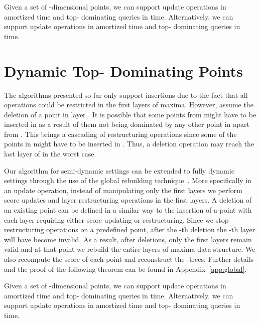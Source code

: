 \documentclass{llncs}
\begin{document}
\begin{theorem} \label{thm:sd}
Given a set  of  -dimensional points, we can support update operations in  amortized time and top- dominating queries in  time. Alternatively, we can support update operations in  amortized time and top- dominating queries in  time.
\end{theorem}



\section{Dynamic Top- Dominating Points} \label{section:DynamicTopKDom}

The algorithms presented so far only support insertions due to the fact that all operations could be restricted in the first  layers of maxima. However, assume the deletion of a point  in layer . It is possible that some points from  might have to be inserted in  as a result of them not being dominated by any other point in  apart from . This brings a cascading of restructuring operations since some of the points in  might have to be inserted in . Thus, a deletion operation may reach the last layer of  in the worst case.

Our algorithm for semi-dynamic settings can be extended to fully dynamic settings through the use of the global rebuilding technique~\cite{OvermarsL81}. More specifically in an update operation, instead of manipulating only the first  layers we perform score updates and layer restructuring operations in the first  layers. A deletion of an existing point can be defined in a similar way to the insertion of a point with each layer requiring either score updating or restructuring. Since we stop restructuring operations on a predefined point, after the -th deletion the -th layer will have become invalid. As a result, after  deletions, only the first  layers remain valid and at that point we rebuild the entire layers of maxima data structure. We also recompute the score of each point and reconstruct the -trees. Further details and the proof of the following theorem can be found in Appendix~\ref{app:global}.


\begin{theorem} \label{thm:fd}
Given a set  of  -dimensional points, we can support update operations in  amortized time and top- dominating queries in  time. Alternatively, we can support update operations in  amortized time and top- dominating queries in  time.
\end{theorem}
\end{document}
